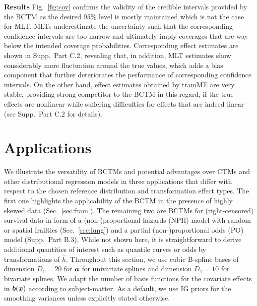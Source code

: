 \documentclass[12pt]{article}
\theoremstyle{plain}
\begin{document}
\noindent\textbf{Results}
Fig.~\ref{fig:cov} confirms the validity of the credible intervals provided by the BCTM as the desired 95\% level is mostly maintained which is not the case for MLT. MLTs underestimate the uncertainty such that the corresponding confidence intervals are too narrow and ultimately imply coverages that are way below the intended coverage probabilities. Corresponding effect estimates are shown in  Supp.~Part C.2, revealing that, in addition, MLT estimates show considerably more fluctuation around the true values, which adds a bias component that further deteriorates the performance of corresponding confidence intervals. On the other hand, effect estimates obtained by tramME are very stable, providing strong competitor to the BCTM in this regard, if the true effects are nonlinear while suffering difficulties for effects that are indeed linear (see Supp.~Part C.2 for details).

\section{Applications}\label{sec:apps}


We illustrate the versatility of BCTMs and potential advantages over CTMs and other distributional regression models in three applications that differ with respect to the chosen reference distribution and transformation effect types. The first one highlights the applicability of the BCTM in the presence of highly skewed data (Sec.~\ref{sec:fram}). The remaining two are BCTMs for (right-censored) survival data in form of a (non-)proportional hazards (NPH) model with random or spatial frailties
(Sec.~\ref{sec:lung}) and a partial (non-)proportional odds (PO) model (Supp.~Part B.3). While not shown here, it is straightforward to derive additional quantities of interest such as quantile curves or odds by transformations of $\hat{h}$. Throughout this section, we use cubic B-spline bases of dimension $D_1=20$ for $\text{\boldmath$a$}$ for univariate splines and dimension $D_1=10$ for bivariate splines. We adapt the number of basis functions for the covariate effects in $\text{\boldmath$b$}(\text{\boldmath$x$})$ according to subject-matter. As a default, we use IG priors for the smoothing variances unless explicitly stated otherwise.
\end{document}
